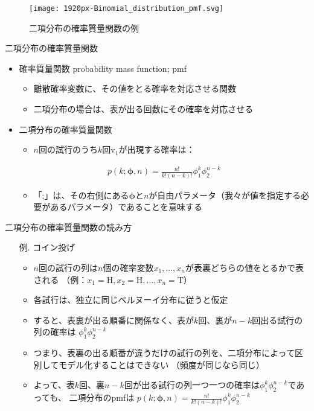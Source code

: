 \documentclass[aspectratio=169,unicode,dvipdfmx,14pt]{beamer}
\begin{document}
\begin{frame}
\begin{figure}[htbp]
\begin{center}
\vspace{.2in}
\texttt{[image: 1920px-Binomial\_distribution\_pmf.svg]}
\caption{二項分布の確率質量関数の例}
\label{}
\end{center}
\end{figure}
\end{frame}

\begin{frame}{二項分布の確率質量関数}
\begin{itemize}
\item 確率質量関数 probability mass function; pmf
\begin{itemize}
\item 離散確率変数に、その値をとる確率を対応させる関数
\item 二項分布の場合は、表が出る回数にその確率を対応させる
\end{itemize}
\item 二項分布の確率質量関数
\begin{itemize}
\item $n$回の試行のうち$k$回$\mbox{v}_1$が出現する確率は：
\end{itemize}
\begin{align}
p(k;\bm{\phi},n)=\frac{n!}{k!(n-k)!}\phi_1^k\phi_2^{n-k}
\end{align}
\begin{itemize}
\item 「;」は、その右側にある$\bm{\phi}$と$n$が自由パラメータ（我々が値を指定する必要があるパラメータ）であることを意味する
\end{itemize}
\end{itemize}
\end{frame}

\begin{frame}{二項分布の確率質量関数の読み方}
\begin{itemize}
\item[例.] コイン投げ
\begin{itemize}
\item $n$回の試行の列は$n$個の確率変数$x_1,\ldots,x_n$が表裏どちらの値をとるかで表される
（例：$x_1=\mbox{H},x_2=\mbox{H},\ldots,x_n=\mbox{T}$）
\item 各試行は、独立に同じベルヌーイ分布に従うと仮定
\item すると、表裏が出る順番に関係なく、表が$k$回、裏が$n-k$回出る試行の列の確率は
$\phi_1^k \phi_2^{n-k}$
\item つまり、表裏の出る順番が違うだけの試行の列を、二項分布によって区別してモデル化することはできない
（頻度が同じなら同じ）
\item よって、表$k$回、裏$n-k$回が出る試行の列一つ一つの確率は$\phi_1^k \phi_2^{n-k}$であっても、
二項分布のpmfは
$p(k;\bm{\phi},n)=\frac{n!}{k!(n-k)!}\phi_1^k\phi_2^{n-k}$
\end{itemize}
\end{itemize}
\end{frame}
\end{document}

